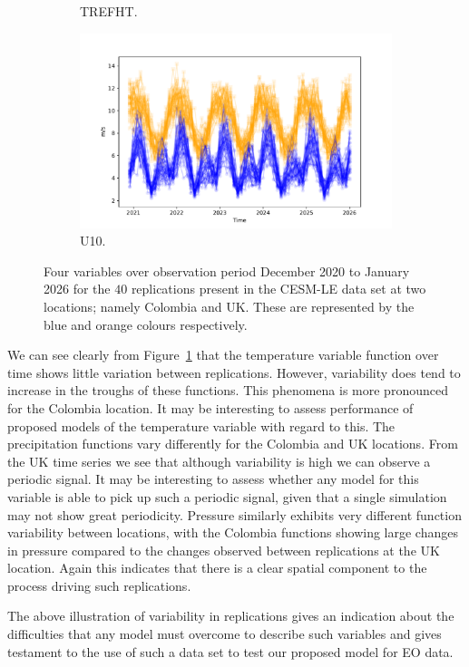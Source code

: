 \begin{figure}[htbp!]
\begin{subfigure}[b]{0.45\textwidth}
		\caption{TREFHT.}
		\label{fig:std_temp_temp}   
	\end{subfigure}             
	\begin{subfigure}[b]{0.45\textwidth}
		\includegraphics[width=\textwidth]{U10_std_temp}
		\caption{U10.}
		\label{fig:std_wind_temp}
	\end{subfigure}             
	\caption[Temporal overview of variability of Precipitation, Pressure, Temperature, and Wind speed.]{ Four variables over observation period December 2020 to January 2026 for the $40$ replications present in the CESM-LE data set at two locations; namely Colombia and UK. These are represented by the blue and orange colours respectively.}
	\label{fig:std_overview_temp}
\end{figure}

We can see clearly from Figure~\ref{fig:std_temp_temp} that the temperature variable function over time shows little variation between replications. 
However, variability does tend to increase in the troughs of these functions. 
This phenomena is more pronounced for the Colombia location. 
It may be interesting to assess performance of proposed models of the temperature variable with regard to this.
The precipitation functions vary differently for the Colombia and UK locations.
From the UK time series we see that although variability is high we can observe a periodic signal. 
It may be interesting to assess whether any model for this variable is able to pick up such a periodic signal, given that a single simulation may not show great periodicity.
Pressure similarly exhibits very different function variability between locations, with the Colombia functions showing large changes in pressure compared to the changes observed between replications at the UK location. 
Again this indicates that there is a clear spatial component to the process driving such replications. 

The above illustration of variability in replications gives an indication about the difficulties that any model must overcome to describe such variables and gives testament to the use of such a data set to test our proposed model for EO data.